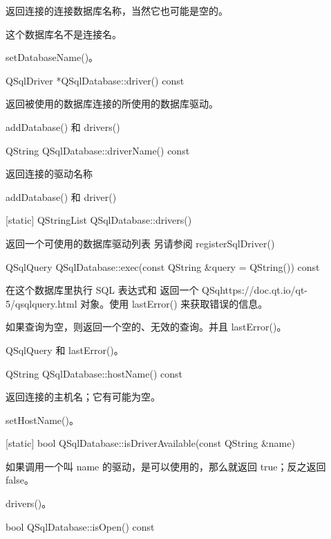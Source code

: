 返回连接的连接数据库名称，当然它也可能是空的。

\begin{notice}
这个数据库名不是连接名。
\end{notice}

\begin{seeAlso}
setDatabaseName()。
\end{seeAlso}

QSqlDriver *QSqlDatabase::driver() const

返回被使用的数据库连接的所使用的数据库驱动。

\begin{seeAlso}
addDatabase() 和 drivers()
\end{seeAlso}

QString QSqlDatabase::driverName() const

返回连接的驱动名称

\begin{seeAlso}
addDatabase() 和 driver()
\end{seeAlso}

[static] QStringList QSqlDatabase::drivers()

返回一个可使用的数据库驱动列表 另请参阅 registerSqlDriver()

QSqlQuery QSqlDatabase::exec(const QString \&query = QString()) const


在这个数据库里执行 SQL 表达式和 返回一个 QSqhttps://doc.qt.io/qt-5/qsqlquery.html 对象。使用 lastError() 来获取错误的信息。

如果查询为空，则返回一个空的、无效的查询。并且 lastError()。

\begin{seeAlso}
QSqlQuery 和 lastError()。
\end{seeAlso}

QString QSqlDatabase::hostName() const


返回连接的主机名；它有可能为空。

\begin{seeAlso}
 setHostName()。
\end{seeAlso}


[static] bool QSqlDatabase::isDriverAvailable(const QString \&name)


如果调用一个叫 name 的驱动，是可以使用的，那么就返回 true；反之返回 false。

\begin{seeAlso}
drivers()。
\end{seeAlso}


bool QSqlDatabase::isOpen() const


